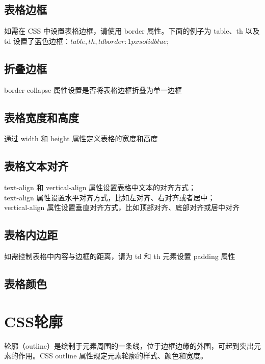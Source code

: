 \documentclass[10pt,UTF8]{ctexart}
\begin{document}
\subsection{表格边框}
如需在 CSS 中设置表格边框，请使用 border 属性。下面的例子为 table、th 以及 td 设置了蓝色边框：$table, th, td{border: 1px solid blue;}$
\subsection{折叠边框}
border-collapse 属性设置是否将表格边框折叠为单一边框
\subsection{表格宽度和高度}
通过 width 和 height 属性定义表格的宽度和高度
\subsection{表格文本对齐}
text-align 和 vertical-align 属性设置表格中文本的对齐方式；\\
text-align 属性设置水平对齐方式，比如左对齐、右对齐或者居中；\\
vertical-align 属性设置垂直对齐方式，比如顶部对齐、底部对齐或居中对齐
\subsection{表格内边距}
如需控制表格中内容与边框的距离，请为 td 和 th 元素设置 padding 属性
\subsection{表格颜色}
\section{CSS轮廓}
轮廓（outline）是绘制于元素周围的一条线，位于边框边缘的外围，可起到突出元素的作用。CSS outline 属性规定元素轮廓的样式、颜色和宽度。
\end{document}
